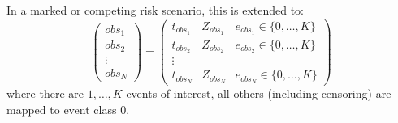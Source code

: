 \documentclass[10pt]{article}
\begin{document}
In a marked or competing risk scenario, this is extended to:
\begin{equation*}
\begin{pmatrix}
obs_1 \\
obs_2 \\
\vdots \\
obs_N
\end{pmatrix}
=
\begin{pmatrix}
    t_{obs_1} & Z_{obs_1} & e_{obs_1} \in \{0, \ldots, K\} \\
    t_{obs_2} & Z_{obs_2} & e_{obs_2} \in \{0, \ldots, K\} \\
\vdots \\
    t_{obs_N} & Z_{obs_N} & e_{obs_N} \in \{0, \ldots, K\} 
\end{pmatrix}
\end{equation*}
where there are $1, \ldots, K$ events of interest, all others (including censoring) are mapped to event class $0$.
\end{document}

